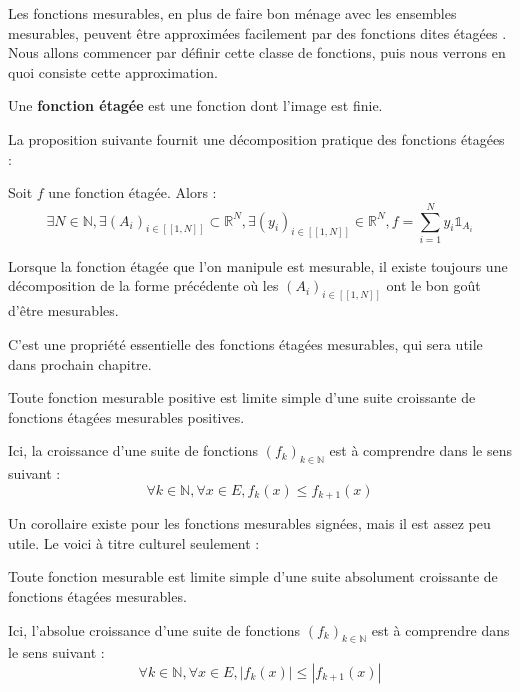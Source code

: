 \documentclass[../integ-proba.tex]{subfiles}
\begin{document}
  Les fonctions mesurables, en plus de faire bon ménage avec les ensembles mesurables, peuvent être approximées facilement par des fonctions dites \og étagées \fg.
  Nous allons commencer par définir cette classe de fonctions, puis nous verrons en quoi consiste cette approximation.

  \begin{defi}
    Une \textbf{fonction étagée} est une fonction dont l'image est finie.
  \end{defi}

  La proposition suivante fournit une décomposition pratique des fonctions étagées :

  \begin{prop}
    Soit $f$ une fonction étagée.
    Alors :
    \begin{displaymath}
      \exists N \in \mathbb{N}, \exists \left(A_i\right)_{i \in [\![1,N]\!]} \subset \mathbb{R}^N, \exists \left(y_i\right)_{i \in [\![1,N]\!]} \in \mathbb{R}^N, f = \sum_{i=1}^{N}y_i\mathds{1}_{A_i}
    \end{displaymath}
  \end{prop}

  \begin{rem}
    Lorsque la fonction étagée que l'on manipule est mesurable, il existe toujours une décomposition de la forme précédente où les $\left(A_i\right)_{i\in[\![1,N]\!]}$ ont le bon goût d'être mesurables.

    C'est une propriété essentielle des fonctions étagées mesurables, qui sera utile dans prochain chapitre.
  \end{rem}

  \begin{thm}
    \label{thm:decompmes}
    Toute fonction mesurable positive est limite simple d'une suite croissante de fonctions étagées mesurables positives.
  \end{thm}

  \begin{rem}
    Ici, la croissance d'une suite de fonctions $\left(f_k\right)_{k\in \mathbb{N}}$ est à comprendre dans le sens suivant :
    \begin{displaymath}
      \forall k \in \mathbb{N}, \forall x \in E, f_k(x) \leq f_{k+1}(x)
    \end{displaymath}
  \end{rem}

  Un corollaire existe pour les fonctions mesurables signées, mais il est assez peu utile.
  Le voici à titre culturel seulement :

  \begin{cor}
    Toute fonction mesurable est limite simple d'une suite absolument croissante de fonctions étagées mesurables.
  \end{cor}

  \begin{rem}
    Ici, l'absolue croissance d'une suite de fonctions $\left(f_k\right)_{k\in \mathbb{N}}$ est à comprendre dans le sens suivant :
    \begin{displaymath}
      \forall k \in \mathbb{N}, \forall x \in E, \left|f_k(x)\right| \leq \left|f_{k+1}(x)\right|
    \end{displaymath}
  \end{rem}
\end{document}
